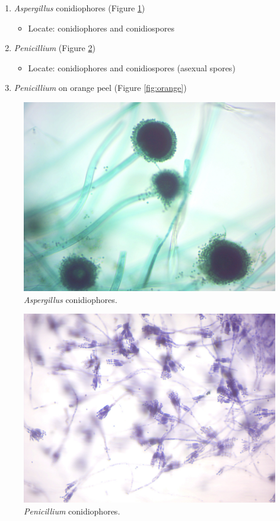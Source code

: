 \begin{enumerate}
\def\labelenumi{\arabic{enumi}.}
\tightlist
\item
  \emph{Aspergillus} conidiophores (Figure \ref{fig:aspergillus})

  \begin{itemize}
  \tightlist
  \item
    Locate: conidiophores and conidiospores
  \end{itemize}
\item
  \emph{Penicillium} (Figure \ref{fig:penicillium})

  \begin{itemize}
  \tightlist
  \item
    Locate: conidiophores and conidiospores (asexual spores)
  \end{itemize}
\item
  \emph{Penicillium} on orange peel (Figure \ref{fig:orange})
\end{enumerate}



\begin{figure}

{\centering \includegraphics[width=0.7\linewidth]{./figures/fungi/aspergillus}

}

\caption{\emph{Aspergillus} conidiophores.}\label{fig:aspergillus}
\end{figure}



\begin{figure}

{\centering \includegraphics[width=0.7\linewidth]{./figures/fungi/penicillium}

}

\caption{\emph{Penicillium} conidiophores.}\label{fig:penicillium}
\end{figure}



